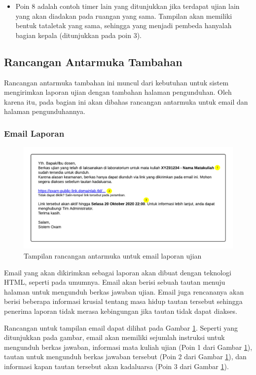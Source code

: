 \begin{itemize}
        \item Poin 8 adalah contoh timer lain yang ditunjukkan jika terdapat ujian lain yang akan diadakan pada
            ruangan yang sama. Tampilan akan memiliki bentuk tataletak yang sama, sehingga yang menjadi pembeda
            hanyalah bagian kepala (ditunjukkan pada poin 3).
    \end{itemize}
    
    
\subsection{Rancangan Antarmuka Tambahan}
    Rancangan antarmuka tambahan ini muncul dari kebutuhan untuk sistem mengirimkan laporan
    ujian dengan tambahan halaman pengunduhan. Oleh karena itu, pada bagian ini akan dibahas rancangan 
    antarmuka untuk email dan halaman pengunduhannya.
    
\subsubsection{Email Laporan}
    \begin{figure}
        \centering
        \includegraphics[width=0.7\paperwidth]{Gambar/mockups/Mockup--Tambahan.pdf}
        \caption{Tampilan rancangan antarmuka untuk email laporan ujian}
        \label{fig:mockup_addition_email}
    \end{figure}
    Email yang akan dikirimkan sebagai laporan akan dibuat dengan teknologi HTML, seperti pada umumnya.
    Email akan berisi sebuah tautan menuju halaman untuk mengunduh berkas jawaban ujian. Email juga
    rencananya akan berisi beberapa informasi krusial tentang masa hidup tautan tersebut sehingga
    penerima laporan tidak merasa kebingungan jika tautan tidak dapat diakses.
    
    Rancangan untuk tampilan email dapat dilihat pada Gambar \ref{fig:mockup_addition_email}. Seperti yang
    ditunjukkan pada gambar, email akan memiliki sejumlah instruksi untuk mengunduh berkas jawaban, informasi
    mata kuliah ujian (Poin 1 dari Gambar \ref{fig:mockup_addition_email}), tautan untuk mengunduh berkas
    jawaban tersebut (Poin 2 dari Gambar \ref{fig:mockup_addition_email}), dan informasi kapan tautan
    tersebut akan kadaluarsa (Poin 3 dari Gambar \ref{fig:mockup_addition_email}).
    
